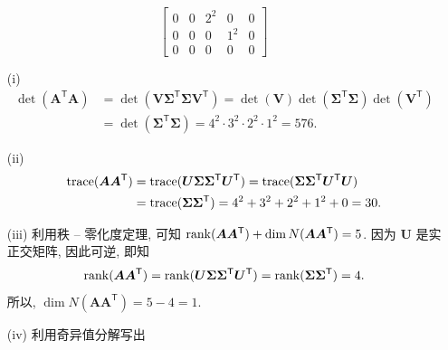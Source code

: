 \documentclass[a4paper, 12pt, UTF8]{ctexart}
\begin{document}
{\begin{solution}
\[\begin{bmatrix}
              0 & 0 & 2^{2} & 0 & 0 \\
              0 & 0 & 0 & 1^{2} & 0 \\
              0 & 0 & 0 & 0 & 0
          \end{bmatrix}
      \]
      \begin{itemize}
          \item[(i)]
          \[
              \begin{aligned}
                  \det(\boldsymbol{A}^{\mathsf{T}}\boldsymbol{A}) &=
                  \det( \boldsymbol{V\Sigma}^{\mathsf T}
                  \boldsymbol{\Sigma V}^{\mathsf T}) = \det(
                  \boldsymbol{V}) \det (\boldsymbol{\Sigma}^{\mathsf T}\boldsymbol{\Sigma}) \det (\boldsymbol{V}^{\mathsf T}) \\
                  &= \det(\boldsymbol{\Sigma}^{\mathsf T}
                  \boldsymbol{\Sigma}) = 4^{2} \cdot 3^{2} \cdot 2^{2}
                  \cdot 1^{2} = 576.
              \end{aligned}
          \]
          \item[(ii)] \[
              \begin{aligned}
                  {\rm
                    trace}(\boldsymbol{A}\boldsymbol{A}^{\mathsf{T}})
                  &= {\rm
                    trace}(\boldsymbol{U\Sigma}\boldsymbol{\Sigma}^{\mathsf
                    T} \boldsymbol{U}^{\mathsf T}) = {\rm
                    trace}(\boldsymbol{\Sigma}\boldsymbol{\Sigma}^{\mathsf
                    T} \boldsymbol{U}^{\mathsf T}\boldsymbol{U}) \\
                  &= {\rm trace}(\boldsymbol{\Sigma}
                  \boldsymbol{\Sigma}^{\mathsf T}) = 4^{2} + 3^{2} +
                  2^{2} + 1^{2} + 0 = 30.
              \end{aligned}
          \]
          \item[(iii)] 利用秩 -- 零化度定理, 可知
          ${\rm rank}(\boldsymbol{A}\boldsymbol{A}^{\mathsf T}) + \dim
          N(\boldsymbol{A}\boldsymbol{A}^{\mathsf{T}}) =
          5$. 因为 $\boldsymbol{U}$ 是实正交矩阵, 因此可逆, 即知
          \[
              {\rm rank}(\boldsymbol{A}\boldsymbol{A}^{\mathsf T}) =
              {\rm
                rank}(\boldsymbol{U\Sigma}\boldsymbol{\Sigma}^{\mathsf
                T} \boldsymbol{U}^{\mathsf T}) = {\rm
                rank}(\boldsymbol{\Sigma} \boldsymbol{\Sigma}^{\mathsf
                T}) = 4.
          \]
          所以,
          $\dim N(\boldsymbol{A}\boldsymbol{A}^{\mathsf T}) = 5-4=1$.
          \item[(iv)] 利用奇异值分解写出

\end{itemize}
\end{solution}}
\end{document}
